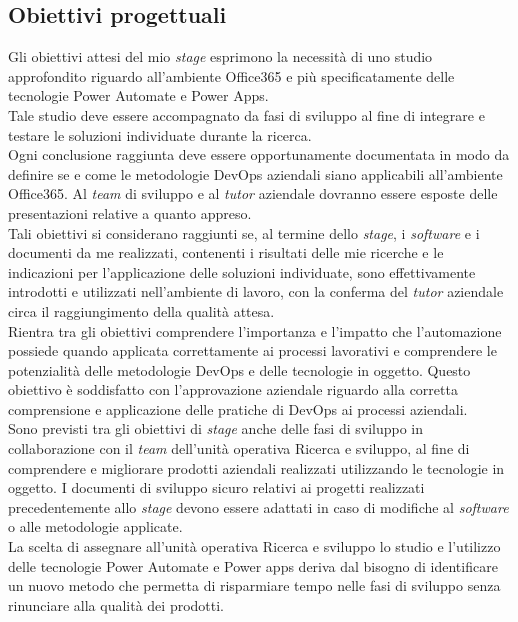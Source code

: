 \subsection{Obiettivi progettuali}
Gli obiettivi attesi del mio \emph{stage} esprimono la necessità di uno studio approfondito riguardo all'ambiente Office365 e più specificatamente delle tecnologie Power Automate e Power Apps.\\
Tale studio deve essere accompagnato da fasi di sviluppo al fine di integrare e testare le soluzioni individuate durante la ricerca.\\
Ogni conclusione raggiunta deve essere opportunamente documentata in modo da definire se e come le metodologie \gls{DevOps} aziendali siano applicabili all'ambiente Office365. Al \emph{team} di sviluppo e al \emph{tutor} aziendale dovranno essere esposte delle presentazioni relative a quanto appreso.\\
Tali obiettivi si considerano raggiunti se, al termine dello \emph{stage}, i \emph{software} e i documenti da me realizzati, contenenti i risultati delle mie ricerche e le indicazioni per l'applicazione delle soluzioni individuate, sono effettivamente introdotti e utilizzati nell'ambiente di lavoro, con la conferma del \emph{tutor} aziendale circa il raggiungimento della qualità attesa.\\
Rientra tra gli obiettivi comprendere l'importanza e l'impatto che l'automazione possiede quando applicata correttamente ai processi lavorativi e comprendere le potenzialità delle metodologie DevOps e delle tecnologie in oggetto. Questo obiettivo è soddisfatto con l'approvazione aziendale riguardo alla corretta comprensione e applicazione delle pratiche di DevOps ai processi aziendali.\\
Sono previsti tra gli obiettivi di \emph{stage} anche delle fasi di sviluppo in collaborazione con il \emph{team} dell'unità operativa Ricerca e sviluppo, al fine di comprendere e migliorare prodotti aziendali realizzati utilizzando le tecnologie in oggetto. I documenti di sviluppo sicuro relativi ai progetti realizzati precedentemente allo \emph{stage} devono essere adattati in caso di modifiche al \emph{software} o alle metodologie applicate.\\
La scelta di assegnare all'unità operativa Ricerca e sviluppo lo studio e l'utilizzo delle tecnologie Power Automate e Power apps deriva dal bisogno di identificare un nuovo metodo che permetta di risparmiare tempo nelle fasi di sviluppo senza rinunciare alla qualità dei prodotti.\\
